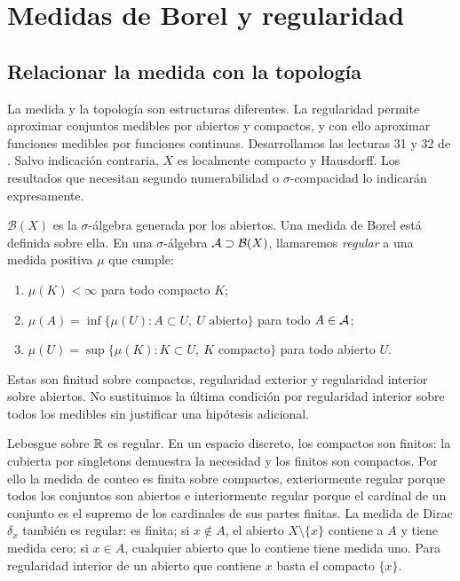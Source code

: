 \chapter{Medidas de Borel y regularidad}\label{v2:cap15}\label{cap:v2-15}
\section{Relacionar la medida con la topología}\label{lectura:v2-31}
La medida y la topología son estructuras diferentes. La regularidad permite aproximar conjuntos medibles por abiertos y compactos, y con ello aproximar funciones medibles por funciones continuas. Desarrollamos las lecturas 31 y 32 de \cite{valencia2}. Salvo indicación contraria, $X$ es localmente compacto y Hausdorff. Los resultados que necesitan segundo numerabilidad o $\sigma$-compacidad lo indicarán expresamente.
\begin{definicion}
$\mathcal B(X)$ es la $\sigma$-álgebra generada por los abiertos. Una medida de Borel está definida sobre ella. En una $\sigma$-álgebra $\mathcal A\supset\mathcal B(X)$, llamaremos \emph{regular} a una medida positiva $\mu$ que cumple:
\begin{enumerate}
\item $\mu(K)<\infty$ para todo compacto $K$;
\item $\mu(A)=\inf\{\mu(U):A\subset U,\ U\text{ abierto}\}$ para todo $A\in\mathcal A$;
\item $\mu(U)=\sup\{\mu(K):K\subset U,\ K\text{ compacto}\}$ para todo abierto $U$.
\end{enumerate}
Estas son finitud sobre compactos, regularidad exterior y regularidad interior sobre abiertos. No sustituimos la última condición por regularidad interior sobre todos los medibles sin justificar una hipótesis adicional.
\end{definicion}
Lebesgue sobre $\mathbb R$ es regular. En un espacio discreto, los compactos son finitos: la cubierta por singletons demuestra la necesidad y los finitos son compactos. Por ello la medida de conteo es finita sobre compactos, exteriormente regular porque todos los conjuntos son abiertos e interiormente regular porque el cardinal de un conjunto es el supremo de los cardinales de sus partes finitas. La medida de Dirac $\delta_x$ también es regular: es finita; si $x\notin A$, el abierto $X\setminus\{x\}$ contiene a $A$ y tiene medida cero; si $x\in A$, cualquier abierto que lo contiene tiene medida uno. Para regularidad interior de un abierto que contiene $x$ basta el compacto $\{x\}$.

